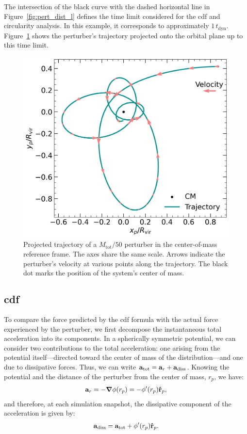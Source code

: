 \documentclass[twocolumn, a4paper]{article}
\begin{document}
The intersection of the black curve with the dashed horizontal line in Figure~\ref{fig:pert_dist_l} defines the time limit considered for the \acrshort{cdf} and circularity analysis. In this example, it corresponds to approximately \(1\, t_\text{dyn}\). Figure~\ref{fig:pert_trajectory} shows the perturber's trajectory projected onto the orbital plane up to this time limit.

\begin{figure}
    \centering
    \includegraphics[width=\columnwidth]{images/pert_trajectory.png}
    \caption{Projected trajectory of a \(M_\text{tot} / 50\) perturber in the center-of-mass reference frame. The axes share the same scale. Arrows indicate the perturber’s velocity at various points along the trajectory. The black dot marks the position of the system’s center of mass.}
    \label{fig:pert_trajectory}
\end{figure}

\subsection{\acrlong{cdf}}

To compare the force predicted by the \acrshort{cdf} formula with the actual force experienced by the perturber, we first decompose the instantaneous total acceleration into its components. In a spherically symmetric potential, we can consider two contributions to the total acceleration: one arising from the potential itself—directed toward the center of mass of the distribution—and one due to dissipative forces. Thus, we can write \(\vb{a}_\text{tot} = \vb{a}_r + \vb{a}_\text{diss}\). Knowing the potential and the distance of the perturber from the center of mass, \(r_p\), we have:
\[
\vb{a}_r = -\grad{\phi(r_p)} = -\phi'(r_p) \vu{r}_p,
\]
and therefore, at each simulation snapshot, the dissipative component of the acceleration is given by:
\begin{equation}
    \vb{a}_\text{diss} = \vb{a}_\text{tot} + \phi'(r_p) \vu{r}_p.
    \label{eq:a_diss}
\end{equation}
\end{document}
